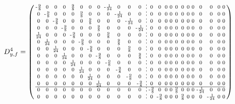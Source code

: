 \documentclass[pdftex,a4paper,parskip,listof=totoc,bibliography=totoc,onehalfspacing,12pt]{scrreprt}
\newcommand*\dashline{\hspace{-0.3em}\rotatebox[origin=c]{90}{\scalebox{-0.3}[1]{$-~~-$}}\hspace{-0.3em}}
\begin{document}
\begin{align*}
	D_{y,f}^4 &= \begin{psmallmatrix}
\text{-}\frac{9}{8} & 0 & 0 & 0 & \frac{9}{8} & 0 & 0 & 0 & \text{-}\frac{1}{24} & 0 & 0 & 0 &\dashline& 0 & 0 & 0 & 0 & 0 & 0 & 0 & 0 & 0 & 0 & 0 & 0 \\
0 & \text{-}\frac{9}{8} & 0 & 0 & 0 & \frac{9}{8} & 0 & 0 & 0 & \text{-}\frac{1}{24} & 0 & 0 &\dashline& 0 & 0 & 0 & 0 & 0 & 0 & 0 & 0 & 0 & 0 & 0 & 0 \\
0 & 0 & \text{-}\frac{9}{8} & 0 & 0 & 0 & \frac{9}{8} & 0 & 0 & 0 & \text{-}\frac{1}{24} & 0 &\dashline& 0 & 0 & 0 & 0 & 0 & 0 & 0 & 0 & 0 & 0 & 0 & 0 \\
0 & 0 & 0 & \text{-}\frac{9}{8} & 0 & 0 & 0 & \frac{9}{8} & 0 & 0 & 0 & \text{-}\frac{1}{24} &\dashline& 0 & 0 & 0 & 0 & 0 & 0 & 0 & 0 & 0 & 0 & 0 & 0 \\
\frac{1}{24} & 0 & 0 & 0 & \text{-}\frac{9}{8} & 0 & 0 & 0 & \frac{9}{8} & 0 & 0 & 0 &\dashline& 0 & 0 & 0 & 0 & 0 & 0 & 0 & 0 & 0 & 0 & 0 & 0 \\
0 & \frac{1}{24} & 0 & 0 & 0 & \text{-}\frac{9}{8} & 0 & 0 & 0 & \frac{9}{8} & 0 & 0 &\dashline& 0 & 0 & 0 & 0 & 0 & 0 & 0 & 0 & 0 & 0 & 0 & 0 \\
0 & 0 & \frac{1}{24} & 0 & 0 & 0 & \text{-}\frac{9}{8} & 0 & 0 & 0 & \frac{9}{8} & 0 &\dashline& 0 & 0 & 0 & 0 & 0 & 0 & 0 & 0 & 0 & 0 & 0 & 0 \\
0 & 0 & 0 & \frac{1}{24} & 0 & 0 & 0 & \text{-}\frac{9}{8} & 0 & 0 & 0 & \frac{9}{8} &\dashline& 0 & 0 & 0 & 0 & 0 & 0 & 0 & 0 & 0 & 0 & 0 & 0 \\
0 & 0 & 0 & 0 & \frac{1}{24} & 0 & 0 & 0 & \text{-}\frac{9}{8} & 0 & 0 & 0 &\dashline& 0 & 0 & 0 & 0 & 0 & 0 & 0 & 0 & 0 & 0 & 0 & 0 \\
0 & 0 & 0 & 0 & 0 & \frac{1}{24} & 0 & 0 & 0 & \text{-}\frac{9}{8} & 0 & 0 &\dashline& 0 & 0 & 0 & 0 & 0 & 0 & 0 & 0 & 0 & 0 & 0 & 0 \\
0 & 0 & 0 & 0 & 0 & 0 & \frac{1}{24} & 0 & 0 & 0 & \text{-}\frac{9}{8} & 0 &\dashline& 0 & 0 & 0 & 0 & 0 & 0 & 0 & 0 & 0 & 0 & 0 & 0 \\
0 & 0 & 0 & 0 & 0 & 0 & 0 & \frac{1}{24} & 0 & 0 & 0 & \text{-}\frac{9}{8} &\dashline& 0 & 0 & 0 & 0 & 0 & 0 & 0 & 0 & 0 & 0 & 0 & 0 \\\hline
0 & 0 & 0 & 0 & 0 & 0 & 0 & 0 & 0 & 0 & 0 & 0 &\dashline& \text{-}\frac{9}{8} & 0 & 0 & 0 & \frac{9}{8} & 0 & 0 & 0 & \text{-}\frac{1}{24} & 0 & 0 & 0 \\
0 & 0 & 0 & 0 & 0 & 0 & 0 & 0 & 0 & 0 & 0 & 0 &\dashline& 0 & \text{-}\frac{9}{8} & 0 & 0 & 0 & \frac{9}{8} & 0 & 0 & 0 & \text{-}\frac{1}{24} & 0 & 0 \\

\end{psmallmatrix}
\end{align*}
\end{document}
